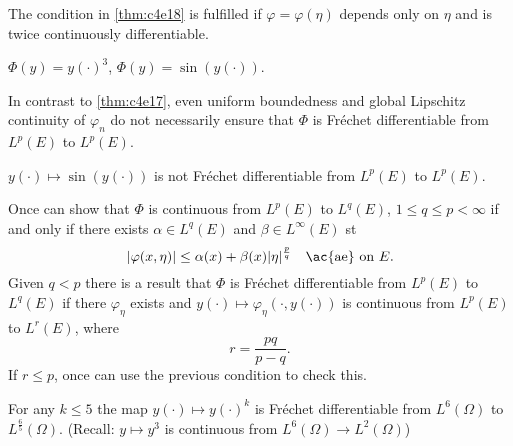 \documentclass[../skript.tex]{subfiles}
\begin{document}
\begin{remark} %
\label{rem:c4e19}
The condition in \cref{thm:c4e18} is fulfilled if $\varphi = \varphi(\eta)$ depends only on $\eta$ and is twice continuously differentiable.
\end{remark}
\begin{example}
$\Phi(y) = y(\cdot)^3$, \; $\Phi(y) = \sin(y(\cdot))$.
\end{example}
\begin{remark} %
\label{rem:c4e20}
In contrast to \cref{thm:c4e17}, even uniform boundedness and global Lipschitz continuity of $\varphi_n$ do not necessarily ensure that $\Phi$ is Fréchet differentiable from $L^p(E)$ to $L^p(E)$.
\end{remark}
\begin{example}
$y(\cdot) \mapsto \sin(y(\cdot))$ is not Fréchet differentiable from $L^p(E)$ to $L^p(E)$.
\end{example}
Once can show that $\Phi$ is continuous from $L^p(E)$ to $L^q(E)$, $1 \leq q \leq p < \infty$ if and only if there exists $\alpha \in L^q(E)$ and $\beta \in L^\infty(E)$ \ac{st}
\[
	|\varphi(x, \eta)| \leq \alpha(x) + \beta(x) |\eta|^\frac{p}{q} \quad \text{\ac{ae}\ on $E$}.
\]
Given $q < p$ there is a result that $\Phi$ is Fréchet differentiable from $L^p(E)$ to $L^q(E)$ if there $\varphi_\eta$ exists and $y(\cdot) \mapsto \varphi_\eta(\cdot, y(\cdot))$ is continuous from $L^p(E)$ to $L^r(E)$, where
\[
	r = \frac{pq}{p - q}.
\]
If $r \leq p$, once can use the previous condition to check this.
\begin{example}
For any $k \leq 5$ the map $y(\cdot) \mapsto y(\cdot)^k$ is Fréchet differentiable from $L^6(\Omega)$ to $L^\frac{6}{5}(\Omega)$. (Recall: $y \mapsto y^3$ is continuous from $L^6(\Omega) \to L^2(\Omega)$) 
\end{example}
\end{document}
